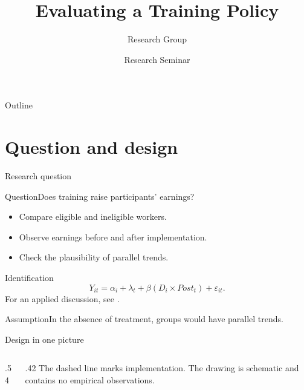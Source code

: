 \documentclass[aspectratio=169]{beamer}
\title[Policy evaluation]{Evaluating a Training Policy}
\author{Research Group}
\institute{Department of Economics}
\date{Research Seminar}
\begin{document}
\begin{frame}\titlepage\end{frame}
\begin{frame}{Outline}\tableofcontents\end{frame}
\section{Question and design}
\begin{frame}{Research question}
\begin{block}{Question}Does training raise participants' earnings?\end{block}
\begin{itemize}
\item<1-> Compare eligible and ineligible workers.
\item<2-> Observe earnings before and after implementation.
\item<3-> Check the plausibility of parallel trends.
\end{itemize}
\end{frame}
\begin{frame}{Identification}
\begin{equation}
Y_{it}=\alpha_i+\lambda_t+\beta(D_i\times Post_t)+\varepsilon_{it}.
\label{eq:did}
\end{equation}
For an applied discussion, see \cite{angrist}.
\begin{alertblock}{Assumption}In the absence of treatment, groups would have parallel trends.\end{alertblock}
\end{frame}
\begin{frame}{Design in one picture}
\begin{columns}[T,onlytextwidth]
\begin{column}{.54\textwidth}
\centering
{}
\end{column}
\begin{column}{.42\textwidth}
The dashed line marks implementation. The drawing is schematic and contains no empirical observations.
\end{column}
\end{columns}
\end{frame}
\end{document}
